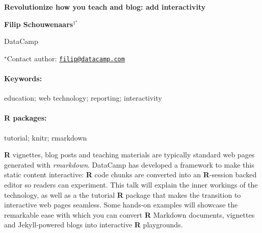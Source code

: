 \documentclass[11pt, a4paper]{article}
\renewcommand{\title}[1]{\begin{center}{\bf \LARGE #1}\end{center}}
\newcommand{\keywords}{\paragraph{Keywords:}}
\newcommand{\packages}{\paragraph{R packages:}}
\begin{document}
\pagestyle{empty}

\title{Revolutionize how you teach and blog: add interactivity}

\begin{center}
  {\bf Filip Schouwenaars$^{1^\star}$}
\end{center}

\vskip 0.3cm

\begin{affiliations}
\begin{enumerate}
\begin{minipage}{0.915\textwidth}
\centering
\item DataCamp \\[-2pt]
\end{minipage}
\end{enumerate}
$^\star$Contact author: \href{mailto:filip@datacamp.com}{\nolinkurl{filip@datacamp.com}}\\
\end{affiliations}

\vskip 0.5cm

\begin{minipage}{0.915\textwidth}
\keywords education; web technology; reporting; interactivity
\packages tutorial; knitr; rmarkdown
\end{minipage}

\vskip 0.8cm

\textbf{R} vignettes, blog posts and teaching materials are typically
standard web pages generated with \emph{rmarkdown}. DataCamp has
developed a framework to make this static content interactive:
\textbf{R} code chunks are converted into an \textbf{R}-session backed
editor so readers can experiment. This talk will explain the inner
workings of the technology, as well as a the tutorial \textbf{R} package
that makes the transition to interactive web pages seamless. Some
hands-on examples will showcase the remarkable ease with which you can
convert \textbf{R} Markdown documents, vignettes and Jekyll-powered
blogs into interactive \textbf{R} playgrounds.
\end{document}
